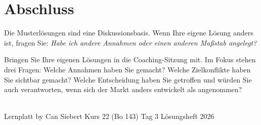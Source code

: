 \documentclass[11pt,a4paper,oneside]{article}
\begin{document}
\clearpage

\section*{Abschluss}
\thispagestyle{plain}

\noindent Die Musterlösungen sind eine Diskussionsbasis. Wenn Ihre eigene Lösung anders ist, fragen Sie: \emph{Habe ich andere Annahmen \textendash{} oder einen anderen Maßstab angelegt?}

\medskip
\begin{infobox}
Bringen Sie Ihre eigenen Lösungen in die Coaching-Sitzung mit. Im Fokus stehen drei Fragen: Welche Annahmen haben Sie gemacht? Welche Zielkonflikte haben Sie sichtbar gemacht? Welche Entscheidung haben Sie getroffen \textendash{} und würden Sie auch verantworten, wenn sich der Markt anders entwickelt als angenommen?
\end{infobox}

\vspace{1cm}
\noindent{\color{lpAccent}\rule{\linewidth}{0.6pt}}\\[4pt]
{\footnotesize\sffamily\color{lpGray}Lernplatt \textperiodcentered{} by Can Siebert \textperiodcentered{} Kurs 22 (Bo 143) \textperiodcentered{} Tag 3 \textperiodcentered{} Lösungsheft \textperiodcentered{} \textcopyright{} 2026}
\end{document}
